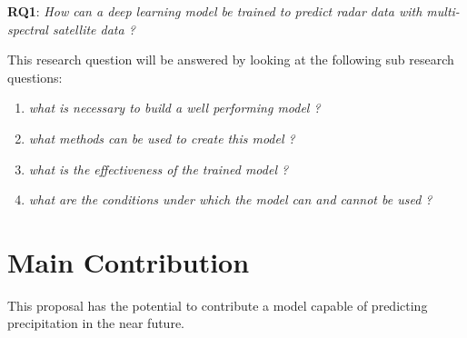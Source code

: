 \documentclass[acmtog, authorversion]{acmart}
\begin{document}



\textbf{RQ1}: \textit{How can a deep learning model be trained to predict radar data with multi-spectral satellite data ?}
\smallskip

This research question will be answered by looking at the following sub research questions:
\begin{enumerate}
    \item \textit{what is necessary to build a well performing model ?}
    \item \textit{what methods can be used to create this model ?}
    \item \textit{what is the effectiveness of the trained model ?}
    \item \textit{what are the conditions under which the model can and cannot be used ?}
\end{enumerate}

\section{Main Contribution}
This proposal has the potential to contribute a model capable of predicting precipitation in the near future.
\end{document}
